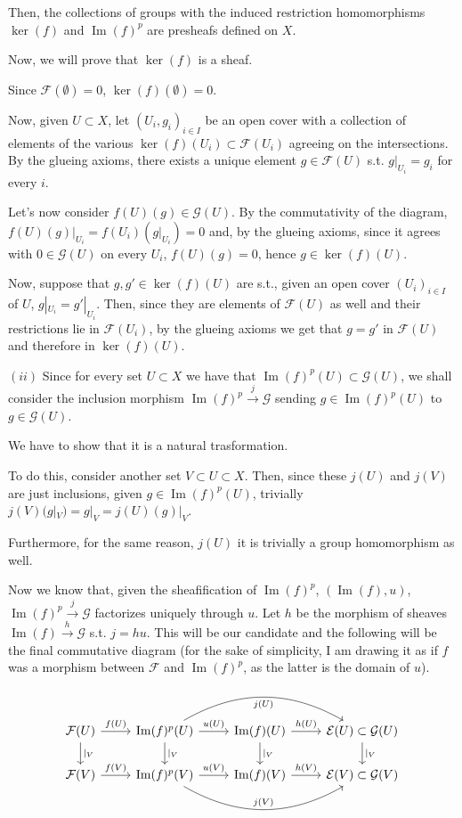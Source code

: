 \documentclass{article}
\DeclareMathOperator{\Ima}{Im}
\begin{document}
Then, the collections of groups with the induced restriction homomorphisms $\ker(f)$ and $\Ima(f)^p$ are presheafs defined on $X$.

Now, we will prove that $\ker(f)$ is a sheaf.

Since $\mathcal{F}(\emptyset)=0$, $\ker(f)(\emptyset)=0$.

Now, given $U\subset X$, let $(U_i,g_i)_{i\in I}$ be an open cover with a collection of elements of the various $\ker(f)(U_i)\subset\mathcal{F}(U_i)$ agreeing on the intersections. By the glueing axioms, there exists a unique element $g\in\mathcal{F}(U)$ s.t. $g|_{U_i}=g_i$ for every $i$.

Let's now consider $f(U)(g)\in\mathcal{G}(U)$. By the commutativity of the diagram, $f(U)(g)|_{U_i}=f(U_i)(g|_{U_i})=0$ and, by the glueing axioms, since it agrees with $0\in\mathcal{G}(U)$ on every $U_i$, $f(U)(g)=0$, hence $g\in\ker(f)(U)$.

Now, suppose that $g,g'\in\ker(f)(U)$ are s.t., given an open cover $(U_i)_{i\in I}$ of $U$, $g|_{U_i}=g'|_{U_i}$. Then, since they are elements of $\mathcal{F}(U)$ as well and their restrictions lie in $\mathcal{F}(U_i)$, by the glueing axioms we get that $g=g'$ in $\mathcal{F}(U)$ and therefore in $\ker(f)(U)$.

$(ii)$ Since for every set $U\subset X$ we have that $\Ima(f)^p(U)\subset\mathcal{G}(U)$, we shall consider the inclusion morphism $\Ima(f)^p\xrightarrow{j}\mathcal{G}$ sending $g\in\Ima(f)^p(U)$ to $g\in\mathcal{G}(U)$.

We have to show that it is a natural trasformation.

To do this, consider another set $V\subset U\subset X$. Then, since these $j(U)$ and $j(V)$ are just inclusions, given $g\in\Ima(f)^p(U)$, trivially $j(V)(g|_{V})=g|_{V}=j(U)(g)|_{V}$.

Furthermore, for the same reason, $j(U)$ it is trivially a group homomorphism as well.

Now we know that, given the sheafification of $\Ima(f)^p$, $(\Ima(f),u)$, $\Ima(f)^p\xrightarrow{j}\mathcal{G}$ factorizes uniquely through $u$. Let $h$ be the morphism of sheaves $\Ima(f)\xrightarrow{h}\mathcal{G}$ s.t. $j=hu$. This will be our candidate and the following will be the final commutative diagram (for the sake of simplicity, I am drawing it as if $f$ was a morphism between $\mathcal{F}$ and $\Ima(f)^p$, as the latter is the domain of $u$).

\[
  \begin{tikzcd}
    \mathcal{F}(U)\arrow{d}{|_V}\arrow{r}{f(U)}
    &\Ima(f)^p(U)\arrow{d}{|_V}\arrow{r}{u(U)}\arrow[bend left, swap]{rr}{j(U)}
    &\Ima(f)(U)\arrow{d}{|_V}\arrow{r}{h(U)}
    &\mathcal{E}(U)\subset\mathcal{G}(U)\arrow{d}{|_V} \\
    \mathcal{F}(V)\arrow{r}{f(V)}
    &\Ima(f)^p(V)\arrow{r}{u(V)}\arrow[bend right]{rr}{j(V)}
    &\Ima(f)(V)\arrow{r}{h(V)}
    &\mathcal{E}(V)\subset\mathcal{G}(V)
  \end{tikzcd}
\]
\end{document}
